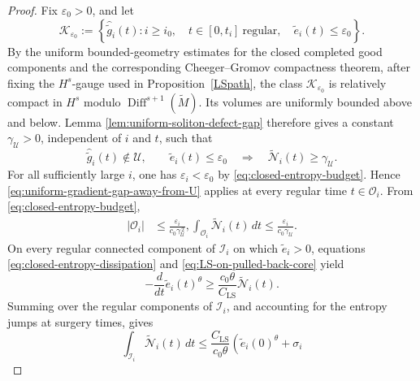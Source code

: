 \documentclass[10pt,a4paper]{amsart}
\begin{document}
\begin{proof}
\noindent Fix \(\varepsilon_0>0\), and let
\[
        \mathscr K_{\varepsilon_0}
        :=
        \left\{
        \widehat{\widetilde g}_i(t):
        i\geq i_0,\quad
        t\in[0,t_i]\ \text{regular},\quad
        \widetilde e_i(t)\leq\varepsilon_0
        \right\}.
\]
By the uniform bounded-geometry estimates for the closed completed
good components and the corresponding Cheeger--Gromov compactness
theorem, after fixing the \(H^s\)-gauge used in
Proposition~\ref{LSpath}, the class
\(\mathscr K_{\varepsilon_0}\) is relatively compact in \(H^s\)
modulo \(\operatorname{Diff}^{s+1}(\widetilde M)\). Its volumes are
uniformly bounded above and below. Lemma
\ref{lem:uniform-soliton-defect-gap} therefore gives a constant
\(\gamma_{\mathcal U}>0\), independent of \(i\) and \(t\), such
that
\begin{equation}
\label{eq:uniform-gradient-gap-away-from-U}
        \widehat{\widetilde g}_i(t)\notin\mathcal U,
        \qquad
        \widetilde e_i(t)\leq\varepsilon_0
        \quad\Longrightarrow\quad
        \widetilde{\mathcal N}_i(t)
        \geq\gamma_{\mathcal U}.
\end{equation}
For all sufficiently large \(i\), one has
\(\varepsilon_i<\varepsilon_0\) by \eqref{eq:closed-entropy-budget}.
Hence \eqref{eq:uniform-gradient-gap-away-from-U} applies at every
regular time \(t\in\mathcal O_i\). From \eqref{eq:closed-entropy-budget},
\begin{equation}
\label{eq:outside-core-L1}
\begin{aligned}
        |\mathcal O_i|
        &\leq
        \frac{\varepsilon_i}
        {c_0\gamma_{\mathcal U}^{\,2}},\int_{\mathcal O_i}
        \widetilde{\mathcal N}_i(t)\,dt
        \leq
        \frac{\varepsilon_i}
        {c_0\gamma_{\mathcal U}}.
\end{aligned}
\end{equation}
On every regular connected component of \(\mathcal I_i\) on which
\(\widetilde e_i>0\), equations
\eqref{eq:closed-entropy-dissipation} and
\eqref{eq:LS-on-pulled-back-core} yield
\[
        -\frac{d}{dt}\widetilde e_i(t)^\theta
        \geq
        \frac{c_0\theta}{C_{\mathrm{LS}}}
        \widetilde{\mathcal N}_i(t).
\]
Summing over the regular components of \(\mathcal I_i\), and accounting
for the entropy jumps at surgery times, gives
\begin{equation}
\label{eq:inside-core-L1}
        \int_{\mathcal I_i}
        \widetilde{\mathcal N}_i(t)\,dt
        \leq
        \frac{C_{\mathrm{LS}}}{c_0\theta}
        \left(
        \widetilde e_i(0)^\theta+\sigma_i

\end{equation}
\end{proof}
\end{document}
